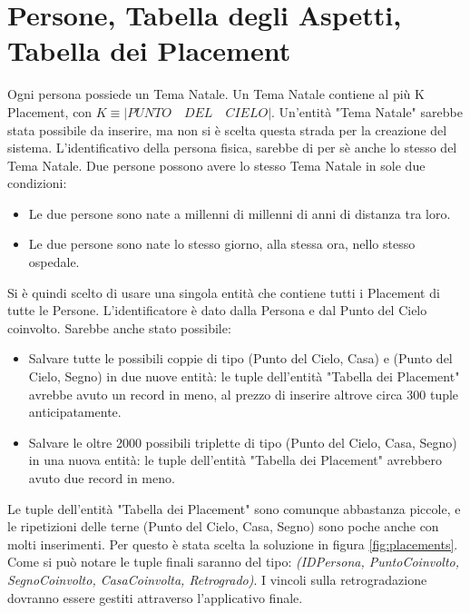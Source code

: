 \newpage

\section{Persone, Tabella degli Aspetti, Tabella dei Placement}
Ogni persona possiede un Tema Natale. Un Tema Natale contiene al più K Placement, con
\begin{math}
K \equiv |PUNTO \quad DEL \quad CIELO|\end{math}.
Un'entità "Tema Natale" sarebbe stata possibile da inserire, ma non si è scelta questa strada per la creazione del sistema.\newline
L'identificativo della persona fisica, sarebbe di per sè anche lo stesso del Tema Natale. Due persone possono avere lo stesso Tema Natale in sole due condizioni:
\begin{itemize}
  \item Le due persone sono nate a millenni di millenni di anni di distanza tra loro.
  \item Le due persone sono nate lo stesso giorno, alla stessa ora, nello stesso ospedale.
\end{itemize}
Si è quindi scelto di usare una singola entità che contiene tutti i Placement di tutte le Persone. L'identificatore è dato dalla Persona e dal Punto del Cielo coinvolto.\newline
Sarebbe anche stato possibile:
\begin{itemize}
  \item Salvare tutte le possibili coppie di tipo (Punto del Cielo, Casa) e (Punto del Cielo, Segno) in due nuove entità: le tuple dell'entità "Tabella dei Placement" avrebbe avuto un record in meno, al prezzo di inserire altrove circa 300 tuple anticipatamente.
  \item Salvare le oltre 2000 possibili triplette di tipo (Punto del Cielo, Casa, Segno) in una nuova entità: le tuple dell'entità "Tabella dei Placement" avrebbero avuto due record in meno.
\end{itemize}
Le tuple dell'entità "Tabella dei Placement" sono comunque abbastanza piccole, e le ripetizioni delle terne (Punto del Cielo, Casa, Segno) sono poche anche con molti inserimenti.
Per questo è stata scelta la soluzione in figura \ref{fig:placements}.\newline
Come si può notare le tuple finali saranno del tipo:\newline
\textit{(IDPersona, PuntoCoinvolto, SegnoCoinvolto, CasaCoinvolta, Retrogrado)}.\newline
I vincoli sulla retrogradazione dovranno essere gestiti attraverso l'applicativo finale.\newline

